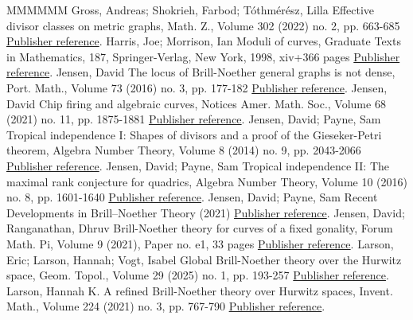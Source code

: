 \begin{thebibliography}{MMMMMM}
 Gross, Andreas; Shokrieh, Farbod; Tóthmérész, Lilla Effective divisor classes on metric graphs, Math. Z., Volume 302 (2022) no. 2, pp. 663-685 \href{https://alco.centre-mersenne.org/articles/10.5802/alco.443/#GSTSemibreak}{Publisher reference}.
 Harris, Joe; Morrison, Ian Moduli of curves, Graduate Texts in Mathematics, 187, Springer-Verlag, New York, 1998, xiv+366 pages \href{https://alco.centre-mersenne.org/articles/10.5802/alco.443/#HarrisMorrison}{Publisher reference}.
 Jensen, David The locus of Brill-Noether general graphs is not dense, Port. Math., Volume 73 (2016) no. 3, pp. 177-182 \href{https://alco.centre-mersenne.org/articles/10.5802/alco.443/#jensenNotDense}{Publisher reference}.
 Jensen, David Chip firing and algebraic curves, Notices Amer. Math. Soc., Volume 68 (2021) no. 11, pp. 1875-1881 \href{https://alco.centre-mersenne.org/articles/10.5802/alco.443/#jensenNotices}{Publisher reference}.
 Jensen, David; Payne, Sam Tropical independence I: Shapes of divisors and a proof of the Gieseker-Petri theorem, Algebra Number Theory, Volume 8 (2014) no. 9, pp. 2043-2066 \href{https://alco.centre-mersenne.org/articles/10.5802/alco.443/#JensenPayneTP1}{Publisher reference}.
 Jensen, David; Payne, Sam Tropical independence II: The maximal rank conjecture for quadrics, Algebra Number Theory, Volume 10 (2016) no. 8, pp. 1601-1640 \href{https://alco.centre-mersenne.org/articles/10.5802/alco.443/#JensenPayneTP2}{Publisher reference}.
 Jensen, David; Payne, Sam Recent Developments in Brill–Noether Theory (2021) \href{https://alco.centre-mersenne.org/articles/10.5802/alco.443/#jensen2021recent}{Publisher reference}.
 Jensen, David; Ranganathan, Dhruv Brill-Noether theory for curves of a fixed gonality, Forum Math. Pi, Volume 9 (2021), Paper no. e1, 33 pages \href{https://alco.centre-mersenne.org/articles/10.5802/alco.443/#JensenRanganathan}{Publisher reference}.
 Larson, Eric; Larson, Hannah; Vogt, Isabel Global Brill-Noether theory over the Hurwitz space, Geom. Topol., Volume 29 (2025) no. 1, pp. 193-257 \href{https://alco.centre-mersenne.org/articles/10.5802/alco.443/#larsonLarsonVogt}{Publisher reference}.
 Larson, Hannah K. A refined Brill-Noether theory over Hurwitz spaces, Invent. Math., Volume 224 (2021) no. 3, pp. 767-790 \href{https://alco.centre-mersenne.org/articles/10.5802/alco.443/#larsonHBN}{Publisher reference}.

\end{thebibliography}
